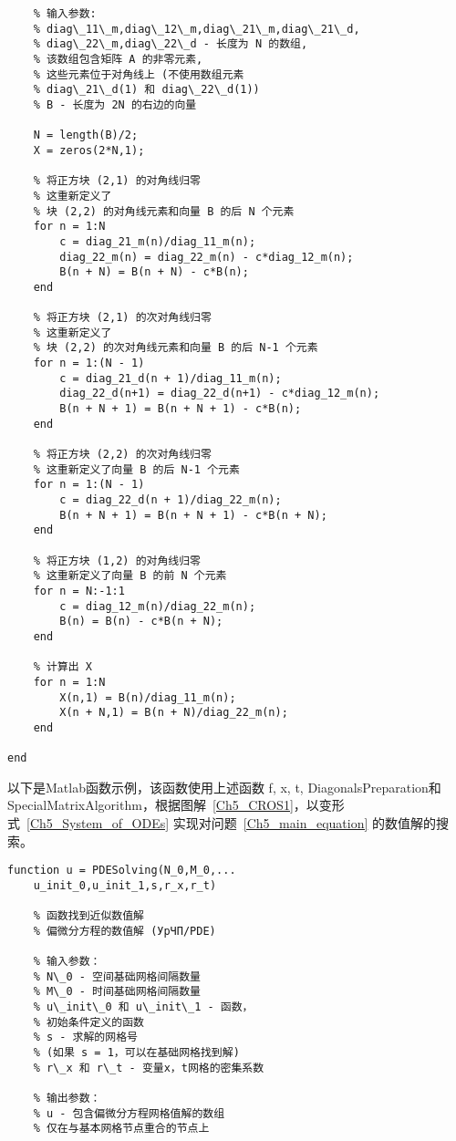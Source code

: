 \documentclass[twoside]{book}
\begin{document}
\begin{CJK*}{GBK}{song}
\begin{lstlisting}
    % 输入参数:
    % diag\_11\_m,diag\_12\_m,diag\_21\_m,diag\_21\_d,
    % diag\_22\_m,diag\_22\_d - 长度为 N 的数组,
    % 该数组包含矩阵 A 的非零元素,
    % 这些元素位于对角线上 (不使用数组元素
    % diag\_21\_d(1) 和 diag\_22\_d(1))
    % B - 长度为 2N 的右边的向量

    N = length(B)/2;
    X = zeros(2*N,1);

    % 将正方块 (2,1) 的对角线归零
    % 这重新定义了
    % 块 (2,2) 的对角线元素和向量 B 的后 N 个元素
    for n = 1:N
        c = diag_21_m(n)/diag_11_m(n);
        diag_22_m(n) = diag_22_m(n) - c*diag_12_m(n);
        B(n + N) = B(n + N) - c*B(n);
    end

    % 将正方块 (2,1) 的次对角线归零
    % 这重新定义了
    % 块 (2,2) 的次对角线元素和向量 B 的后 N-1 个元素
    for n = 1:(N - 1)
        c = diag_21_d(n + 1)/diag_11_m(n);
        diag_22_d(n+1) = diag_22_d(n+1) - c*diag_12_m(n);
        B(n + N + 1) = B(n + N + 1) - c*B(n);
    end

    % 将正方块 (2,2) 的次对角线归零
    % 这重新定义了向量 B 的后 N-1 个元素
    for n = 1:(N - 1)
        c = diag_22_d(n + 1)/diag_22_m(n);
        B(n + N + 1) = B(n + N + 1) - c*B(n + N);
    end

    % 将正方块 (1,2) 的对角线归零
    % 这重新定义了向量 B 的前 N 个元素
    for n = N:-1:1
        c = diag_12_m(n)/diag_22_m(n);
        B(n) = B(n) - c*B(n + N);
    end

    % 计算出 X
    for n = 1:N
        X(n,1) = B(n)/diag_11_m(n);
        X(n + N,1) = B(n + N)/diag_22_m(n);
    end

end
\end{lstlisting}

以下是Matlab函数示例，该函数使用上述函数 f, x, t, DiagonalsPreparation和SpecialMatrixAlgorithm，根据图解~\eqref{Ch5_CROS1}，以变形式~\eqref{Ch5_System_of_ODEs} 实现对问题~\eqref{Ch5_main_equation} 的数值解的搜索。
%
\begin{lstlisting}
function u = PDESolving(N_0,M_0,...
    u_init_0,u_init_1,s,r_x,r_t)

    % 函数找到近似数值解
    % 偏微分方程的数值解 (УрЧП/PDE)

    % 输入参数：
    % N\_0 - 空间基础网格间隔数量
    % M\_0 - 时间基础网格间隔数量
    % u\_init\_0 和 u\_init\_1 - 函数，
    % 初始条件定义的函数
    % s - 求解的网格号
    % (如果 s = 1，可以在基础网格找到解)
    % r\_x 和 r\_t - 变量x，t网格的密集系数

    % 输出参数：
    % u - 包含偏微分方程网格值解的数组
    % 仅在与基本网格节点重合的节点上


\end{lstlisting}
\end{CJK*}
\end{document}
